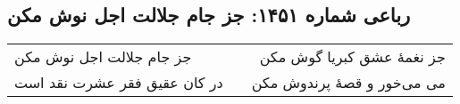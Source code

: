 \begin{center}
\section*{رباعی شماره ۱۴۵۱: جز جام جلالت اجل نوش مکن}
\label{sec:1451}
\begin{longtable}{l p{0.5cm} r}
جز جام جلالت اجل نوش مکن
&&
جز نغمهٔ عشق کبریا گوش مکن
\\
در کان عقیق فقر عشرت نقد است
&&
می می‌خور و قصهٔ پرندوش مکن
\\
\end{longtable}
\end{center}

